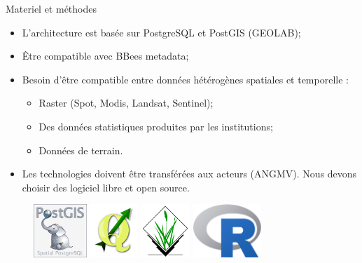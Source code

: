 \documentclass[newPxFont]{beamer}
\begin{document}
\begin{frame}[c]{Materiel et méthodes}
\vspace{-1cm}
\begin{itemize}
	\item L'architecture est basée sur PostgreSQL et PostGIS (GEOLAB);
	\item \^Etre compatible avec BBees metadata;
	\item Besoin d'être compatible entre données hétérogènes spatiales et temporelle :
	\begin{itemize}
		\item Raster (Spot, Modis, Landsat, Sentinel);
		\item Des données statistiques produites par les institutions;
		\item Données de terrain.
	\end{itemize}
	\item Les technologies doivent être transférées aux acteurs (ANGMV). Nous devons choisir des logiciel libre et open source.
\end{itemize}
\begin{figure}
	\centering
	\includegraphics[height=20mm]{img/PostGIS_logo}
	\includegraphics[height=20mm]{img/QGis_Logo}
	\includegraphics[height=20mm]{img/GrassGIS_banner}
	\includegraphics[height=20mm]{img/Rlogo}
\end{figure}
\end{frame}
\end{document}
